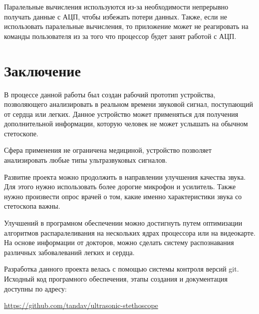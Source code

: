 Паралельные вычисления используются из-за необходимости непрерывно получать данные с АЦП, чтобы избежать потери данных. Также, если не использовать паралельные вычисления, то приложение может не реагировать на команды пользователя из за того что процессор будет занят работой с АЦП.

\newpage
\section{Заключение}
В процессе данной работы был создан рабочий прототип устройства, позволяющего анализировать в реальном времени звуковой сигнал, поступающий от сердца или легких. Данное устройство может применяться для получения дополнительной информации, которую человек не может услышать на обычном стетоскопе.

Сфера применения не ограничена медициной, устройство позволяет анализировать любые типы ультразвуковых сигналов.

Развитие проекта можно продолжить в направлении улучшения качества звука. Для этого нужно использовать более дорогие микрофон и усилитель. Также нужно произвести опрос врачей о том, какие именно характеристики звука со стетоскопа важны.

Улучшений в програмном обеспечении можно достигнуть путем оптимизации алгоритмов распаралеливания на нескольких ядрах процессора или на видеокарте. На основе информации от докторов, можно сделать систему распознавания различных забовалеваний легких и сердца.

Разработка данного проекта велась с помощью системы контроля версий git. Исходный код програмного обеспечения, этапы создания и документация доступны по адресу:

\url{https://github.com/tandav/ultrasonic-stethoscope}

